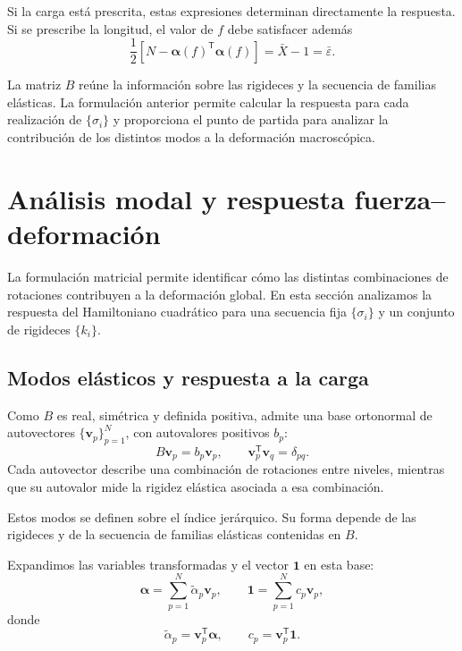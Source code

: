 \documentclass[11pt,a4paper]{article}
\begin{document}
Si la carga está prescrita, estas expresiones determinan
directamente la respuesta. Si se prescribe la longitud,
el valor de $f$ debe satisfacer además
\begin{equation}
\frac12
\left[
N-\boldsymbol{\alpha}(f)^{\mathsf T}
\boldsymbol{\alpha}(f)
\right]
=
\bar X-1
=
\bar\varepsilon.
\label{eq:quadratic_length_constraint}
\end{equation}

La matriz $B$ reúne la información sobre las rigideces y la
secuencia de familias elásticas. La formulación anterior permite
calcular la respuesta para cada realización de $\{\sigma_i\}$ y
proporciona el punto de partida para analizar la contribución de
los distintos modos a la deformación macroscópica.



\section{Análisis modal y respuesta fuerza--deformación}
\label{sec:modal_response}

La formulación matricial permite identificar cómo las distintas
combinaciones de rotaciones contribuyen a la deformación global.
En esta sección analizamos la respuesta del Hamiltoniano
cuadrático para una secuencia fija $\{\sigma_i\}$ y un conjunto
de rigideces $\{k_i\}$.

\subsection{Modos elásticos y respuesta a la carga}

Como $B$ es real, simétrica y definida positiva, admite una
base ortonormal de autovectores $\{\mathbf v_p\}_{p=1}^{N}$,
con autovalores positivos $b_p$:
\begin{equation}
B\mathbf v_p=b_p\mathbf v_p,
\qquad
\mathbf v_p^{\mathsf T}\mathbf v_q=\delta_{pq}.
\label{eq:B_eigenmodes}
\end{equation}
Cada autovector describe una combinación de rotaciones entre
niveles, mientras que su autovalor mide la rigidez elástica
asociada a esa combinación.

Estos modos se definen sobre el índice jerárquico. Su forma
depende de las rigideces y de la secuencia de familias
elásticas contenidas en $B$.

Expandimos las variables transformadas y el vector
$\mathbf1$ en esta base:
\begin{equation}
\boldsymbol{\alpha}
=
\sum_{p=1}^{N}\widetilde{\alpha}_p\mathbf v_p,
\qquad
\mathbf1
=
\sum_{p=1}^{N}c_p\mathbf v_p,
\label{eq:modal_expansion}
\end{equation}
donde
\begin{equation}
\widetilde{\alpha}_p
=
\mathbf v_p^{\mathsf T}\boldsymbol{\alpha},
\qquad
c_p=\mathbf v_p^{\mathsf T}\mathbf1.
\end{equation}
\end{document}
